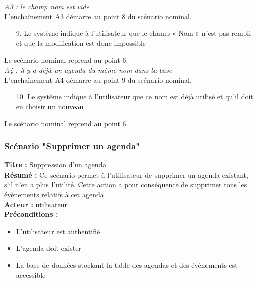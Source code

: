 \documentclass[12pt , a4paper]{article}
\begin{document}
\noindent\textit{A3 : le champ nom est vide}\\
L'encha\^inement A3 démarre au point 8 du scénario nominal.
\begin{enumerate}
\item[9.] Le système indique à l’utilisateur que le champ « Nom » n’est pas rempli et que la modification est donc impossible
\end{enumerate}
Le scénario nominal reprend au point 6.\\


\noindent\textit{A4 : il y a déjà un agenda du même nom dans la base}\\
L'encha\^inement A4 démarre au point 9 du scénario nominal.
\begin{enumerate}
\item[10.] Le système indique à l’utilisateur que ce nom est déjà utilisé et qu’il doit en choisir un nouveau
\end{enumerate}
Le scénario nominal reprend au point 6.\\


\subsubsection{Scénario "Supprimer un agenda"}
\noindent\textbf{Titre : } Suppression d’un agenda\\
\textbf{Résumé : } Ce scénario permet à l’utilisateur de supprimer un agenda existant, s’il n’en a plus l’utilité. Cette action a pour conséquence de supprimer tous les évènements relatifs à cet agenda.\\
\textbf{Acteur : }utilisateur\\

\noindent\textbf{Préconditions :}
\begin{itemize}
\item L’utilisateur est authentifié
\item L'agenda doit exister
\item La base de données stockant la table des agendas et des événements est accessible\\
\end{itemize}
\end{document}
